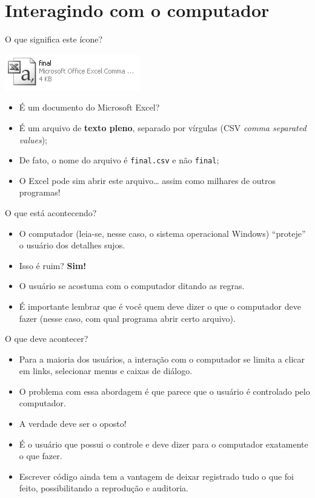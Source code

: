 \documentclass[10pt,a4paper]{book}
\providecommand{\tightlist}{%
  \setlength{\itemsep}{0pt}\setlength{\parskip}{0pt}}
\begin{document}
\section{Interagindo com o
computador}\label{interagindo-com-o-computador}

O que significa este ícone?

\begin{center}\includegraphics[width=0.5\linewidth]{img/excelcsvgrey} \end{center}

\begin{itemize}
\tightlist
\item
  É um documento do Microsoft Excel?
\item
  É um arquivo de \textbf{texto pleno}, separado por vírgulas (CSV
  \emph{comma separated values});
\item
  De fato, o nome do arquivo é \texttt{final.csv} e não \texttt{final};
\item
  O Excel pode sim abrir este arquivo\ldots{} assim como milhares de
  outros programas!
\end{itemize}

O que está acontecendo?

\begin{itemize}
\tightlist
\item
  O computador (leia-se, nesse caso, o sistema operacional Windows)
  ``proteje'' o usuário dos detalhes sujos.
\item
  Isso é ruim? \textbf{Sim!}
\item
  O usuário se acostuma com o computador ditando as regras.
\item
  É importante lembrar que é você quem deve dizer o que o computador
  deve fazer (nesse caso, com qual programa abrir certo arquivo).
\end{itemize}

O que deve acontecer?

\begin{itemize}
\tightlist
\item
  Para a maioria dos usuários, a interação com o computador se limita a
  clicar em links, selecionar menus e caixas de diálogo.
\item
  O problema com essa abordagem é que parece que o usuário é controlado
  pelo computador.
\item
  A verdade deve ser o oposto!
\item
  É o usuário que possui o controle e deve dizer para o computador
  exatamente o que fazer.
\item
  Escrever código ainda tem a vantagem de deixar registrado tudo o que
  foi feito, possibilitando a reprodução e auditoria.
\end{itemize}
\end{document}

